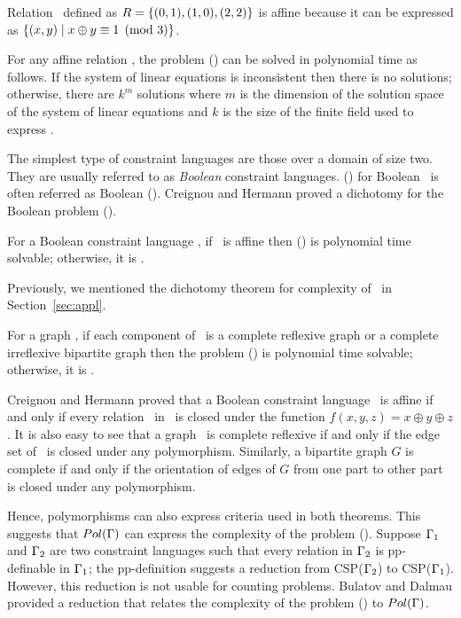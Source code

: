 \begin{example}
Relation \mR\ defined as \(R=\{{(0,1),(1,0),(2,2)}\}\) is affine because it can be expressed as 
\(\{{(x,y)\mid x \oplus y \equiv 1 \pmod{3}}\}\)\@.
\end{example}

For any affine relation \mR, the problem \ccsp(\mR) can be solved in polynomial time
as follows. If the system of linear equations is inconsistent
then there is no solutions; otherwise, there are \(k^m\) solutions where \(m\) is the
dimension of the solution space of the system of linear equations and
\(k\) is the size of the finite field used to express \mR\@.

The simplest type of constraint languages are those 
over a domain of size two. They are usually 
referred to as \emph{Boolean} constraint languages.
\ccsp(\mrelset) for Boolean \mrelset\ is often referred as Boolean \ccsp(\mrelset)\@.
Creignou and Hermann proved a dichotomy for the Boolean problem \ccsp(\mrelset).

\begin{theorem}  
For a Boolean constraint language \mrelset,
if  \mrelset\ is affine then \ccsp(\mrelset) 
is polynomial time solvable; otherwise, it is \cpc\@.
\end{theorem}

Previously, we mentioned the dichotomy theorem for complexity of \ccsp\ in  Section~\ref{sec:appl}.

\begin{theorem}  \label{thm:homd}
For a graph \mH, if each component of \mH\ is a complete reflexive graph
or a complete irreflexive bipartite graph then the problem \chom(\mH)  
is polynomial time solvable; otherwise, it is \cpc\@.
\end{theorem}

Creignou and Hermann \cite{Nadia} proved that a Boolean constraint language \mrelset\
is affine if and only if every relation \mR\ in \mrelset\
is closed under the function \(f(x,y,z)=x\oplus y \oplus z\). It is also easy to see that
a graph \mG\ is complete reflexive if and only if the edge set of \mG\ is closed under any
polymorphism. Similarly, a bipartite graph \(G\) is complete if and only if the orientation
of edges
of \(G\) from one part to other part is closed under any polymorphism.

Hence, polymorphisms can also express criteria used in both theorems. This suggests
that \(Pol(\Gamma)\) can express the complexity of the problem \ccsp(\mrelset).
Suppose \(\Gamma_1\) and \(\Gamma_2\) are two constraint languages such that
every relation in \(\Gamma_2\) is pp-definable in \(\Gamma_1\); 
the pp-definition suggests a reduction from CSP(\(\Gamma_2\))
to CSP(\(\Gamma_1\))\@. However, this reduction is not usable for counting problems. 
Bulatov and Dalmau provided a reduction that relates 
the complexity of the problem \ccsp(\mrelset) to \(Pol(\Gamma)\)\@.

